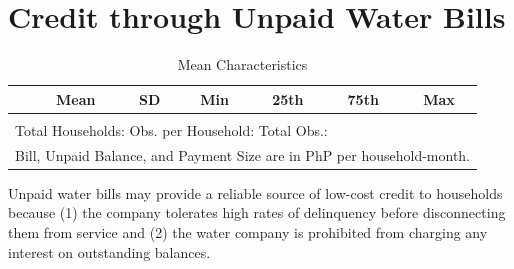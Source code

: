 \documentclass[12pt]{article}
\begin{document}
\section{Credit through Unpaid Water Bills}\label{section:descriptives}



\begin{table}[h!] %
\centering
\caption{Mean Characteristics}\label{table:descriptives_all}
\vspace{-2mm}
\begin{tabular}{l*{1}{cccccc}}
\toprule
 & Mean & SD & Min & 25th & 75th & Max  \\
\midrule

\bottomrule \\ [-.8em]
\multicolumn{7}{l}{Total Households:   Obs. per Household:  Total Obs.: } \\
\multicolumn{7}{l}{\scriptsize Bill, Unpaid Balance, and Payment Size are in PhP per household-month.}
\end{tabular}
\end{table}

Unpaid water bills may provide a reliable source of low-cost credit to households because (1) the company tolerates high rates of delinquency before disconnecting them from service and (2) the water company is prohibited from charging any interest on outstanding balances. 
\end{document}
